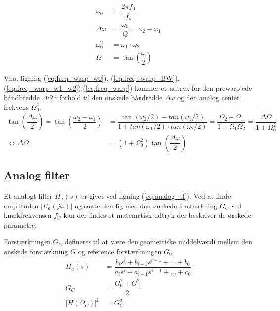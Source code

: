     \begin{align}
    \omega_0 &= \dfrac{2 \pi f_0}{f_s} \label{eq:freq_warp_w0}\\
    \Delta \omega &= \dfrac{\omega_0}{Q} = \omega_2 - \omega_1 \label{eq:freq_warp_BW} \\ 
    \omega_0^2 &= \omega_1 \cdot \omega_2 \label{eq:freq_warp_w1_w2} \\
    \Omega &= \tan\left(  \dfrac{\omega}{2} \right) \label{eq:freq_warp}
    \end{align}
        
    Vha. ligning (\ref{eq:freq_warp_w0}), (\ref{eq:freq_warp_BW}),(\ref{eq:freq_warp_w1_w2}),(\ref{eq:freq_warp}) 
    kommer et udtryk for den prewarp'ede båndbredde $\Delta \Omega$ i 
    forhold til den ønskede båndredde $\Delta \omega$ og den analog center frekvens $\Omega_0^2$.
\begin{align}
    \tan \left( \dfrac{\Delta \omega}{2} \right) = \tan \left( \dfrac{\omega_2 - \omega_1}{2} \right) &= \dfrac{\tan(\omega_2/2) - tan(\omega_1/2)}{1 + tan(\omega_1/2) \cdot tan(\omega_2/2)} = \dfrac{\Omega_2 - \Omega_1}{1 + \Omega_1 \Omega_2} = \dfrac{\Delta \Omega}{1 + \Omega_0^2}\\
    \iff \Delta \Omega &= (1 + \Omega_0^2) \tan \left( \dfrac{\Delta \omega}{2} \right)
\end{align}

    \subsection{Analog filter }

    Et analogt filter $H_a(s)$ er givet ved ligning (\ref{eq:analog_tf}). Ved at finde amplituden $|H_a (j\omega)|$ og sætte den 
    lig med den ønskede forstærkning $G_C$ ved knækfrekvensen $f_C$ kan der findes et matematisk udtryk der beskriver de ønskede parametre.
    
    Forstærkningen $G_C$ defineres til at være den geometriske middelværdi mellem den ønskede forstærkning $G$ og reference forstærkningen $G_0$.
    \begin{align}
        H_a(s) &= \dfrac{b_i s^i + b_{i-1} s^{i-1}+ \dots + b_0 }{a_i s^i + a_{i-1} s^{i-1} +  \dots +a_0 }
        \label{eq:analog_tf} \\
        G_C &= \dfrac{G_0^2 + G^2}{2} \label{eq:analog_gc_def} \\
        |H(\Omega_C)|^2 &= G_C^2 \label{eq:analog_amp}
    \end{align}
    
